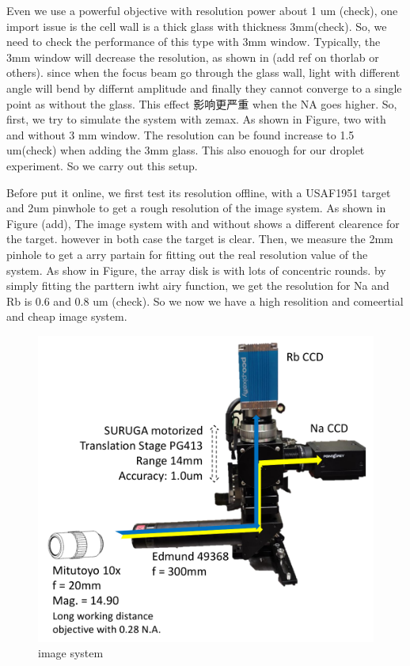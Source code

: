 Even we use a powerful objective with resolution power about 1 um (check), one import issue is the cell wall is a thick glass with thickness 3mm(check). So, we need to check the performance of this type with 3mm window. Typically, the 3mm window will decrease the resolution, as shown in (add ref on thorlab or others). since when the focus beam go through the glass wall, light with different angle will bend by differnt  amplitude and finally they cannot converge to a single point as without the glass. This effect 影响更严重 when the NA goes higher. So, first, we try to simulate the system with zemax. As shown in Figure, two with and without 3 mm window. The resolution can be found increase to 1.5 um(check) when adding the 3mm glass. This also enouogh for our droplet experiment. So we carry out this setup.

Before put it online, we first test its resolution offline, with a USAF1951 target and 2um pinwhole to get a rough resolution of the image system. As shown in Figure (add), The image system with and without shows a different clearence for the target. however in both case the target is clear. Then, we measure the 2mm pinhole to get a arry partain for fitting out the real resolution value of the system. As show in Figure, the array disk is with lots of concentric rounds. by simply fitting the parttern iwht airy function, we get the resolution for Na and Rb is 0.6 and 0.8 um (check). So we now we have a high resolition and comeertial and cheap image system. 

\begin{figure}[hb]
\begin{center}
\includegraphics[width = 0.8\linewidth]{figures/image_system.pdf}
\end{center}
\caption{image system}
\label{image_system}
\end{figure}


